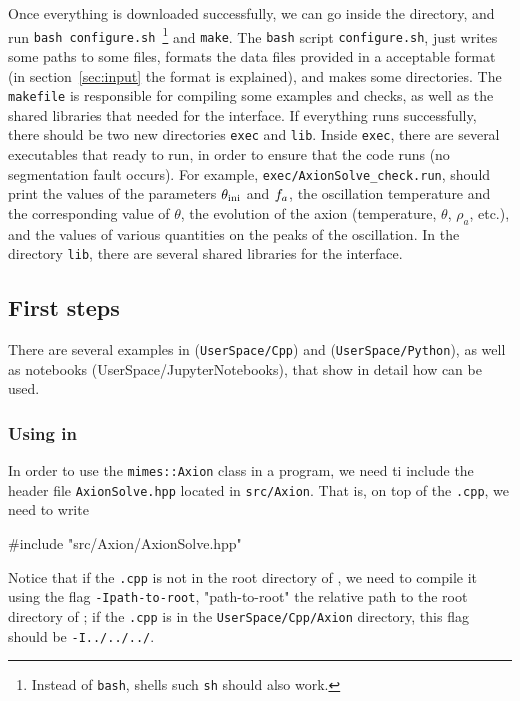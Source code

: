 \documentclass[11pt,a4paper]{article}
\begin{document}
Once everything is downloaded successfully, we can go inside the \mimes directory, and run {\tt bash configure.sh}~\footnote{Instead of {\tt bash}, shells such {\tt sh} should also work.} and {\tt make}.  The {\tt bash} script {\tt configure.sh}, just writes some paths to some files, formats the data files provided in a acceptable format (in section~\ref{sec:input} the format is explained), and makes some directories. The {\tt makefile} is responsible for compiling some examples and checks, as well as the shared libraries that needed for the \PY interface.  If everything runs successfully, there should be two new directories {\tt exec} and {\tt lib}. Inside {\tt exec}, there are several executables that ready to run, in order to ensure that the code runs (\eg no segmentation fault occurs). For example, {\tt exec/AxionSolve\_check.run}, should print the values of the parameters $\theta_{\rm ini}{}$ and $f_{a}{}$, the oscillation temperature and the corresponding value of $\theta$, the evolution of the axion (\eg temperature, $\theta$, $\rho_{a}$, etc.), and the values of various quantities on the peaks of the oscillation.  In the directory {\tt lib}, there are several shared libraries for the \PY interface.

\subsection{First steps} There are several examples in \CPP ({\tt UserSpace/Cpp}) and \PY ({\tt UserSpace/Python}), as well as \JUPY  notebooks ({UserSpace/JupyterNotebooks}), that show in detail how \mimes can be used. 

\subsubsection{Using \mimes in \CPP} 
%
In order to use the {\tt mimes::Axion} class in a \CPP program, we need ti include the header file {\tt AxionSolve.hpp} located in {\tt src/Axion}. That is, on top of the {\tt .cpp}, we need to write 
%
\begin{cpp}
	#include "src/Axion/AxionSolve.hpp"
\end{cpp}
%
Notice that if the  {\tt .cpp} is not in the root directory of \mimes, we need to compile it using the flag {\tt -Ipath-to-root}, "path-to-root" the relative path to the root directory of \mimes; \eg if the {\tt .cpp} is in the {\tt UserSpace/Cpp/Axion} directory, this flag should be {\tt -I../../../}.
\end{document}

